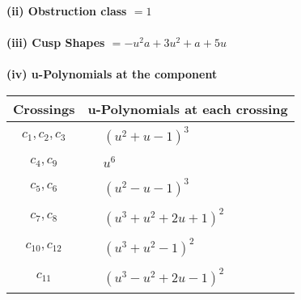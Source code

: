 \documentclass[1p]{elsarticle_modified}
\theoremstyle{definition}
\begin{document}
\flushleft \textbf{(ii) Obstruction class $= 1$}\\~\\
\flushleft \textbf{(iii) Cusp Shapes $= - u^2 a+3 u^2+a+5 u$}\\~\\
\newpage\renewcommand{\arraystretch}{1}
\flushleft \textbf{(iv) u-Polynomials at the component}\newline \\
\begin{tabular}{m{50pt}|m{274pt}}
Crossings & \hspace{64pt}u-Polynomials at each crossing \\
\hline $$\begin{aligned}c_{1},c_{2},c_{3}\end{aligned}$$&$\begin{aligned}
&(u^2+u-1)^3
\end{aligned}$\\
\hline $$\begin{aligned}c_{4},c_{9}\end{aligned}$$&$\begin{aligned}
&u^6
\end{aligned}$\\
\hline $$\begin{aligned}c_{5},c_{6}\end{aligned}$$&$\begin{aligned}
&(u^2- u-1)^3
\end{aligned}$\\
\hline $$\begin{aligned}c_{7},c_{8}\end{aligned}$$&$\begin{aligned}
&(u^3+u^2+2 u+1)^2
\end{aligned}$\\
\hline $$\begin{aligned}c_{10},c_{12}\end{aligned}$$&$\begin{aligned}
&(u^3+u^2-1)^2
\end{aligned}$\\
\hline $$\begin{aligned}c_{11}\end{aligned}$$&$\begin{aligned}
&(u^3- u^2+2 u-1)^2
\end{aligned}$\\
\hline
\end{tabular}\\~\\
\end{document}

